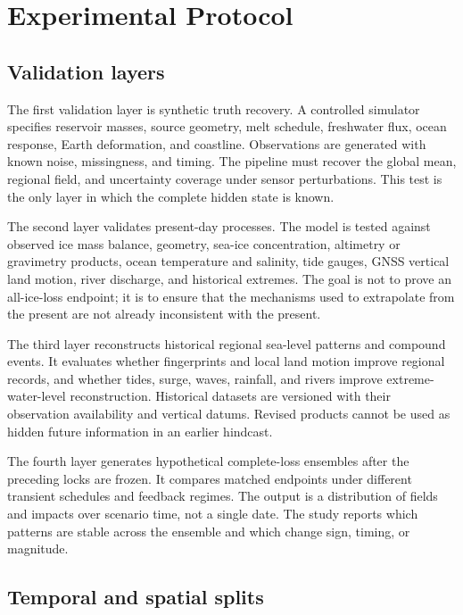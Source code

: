 \documentclass[conference]{IEEEtran}
\begin{document}
\section{Experimental Protocol}

\subsection{Validation layers}

The first validation layer is synthetic truth recovery. A controlled simulator specifies reservoir masses, source geometry, melt schedule, freshwater flux, ocean response, Earth deformation, and coastline. Observations are generated with known noise, missingness, and timing. The pipeline must recover the global mean, regional field, and uncertainty coverage under sensor perturbations. This test is the only layer in which the complete hidden state is known.

The second layer validates present-day processes. The model is tested against observed ice mass balance, geometry, sea-ice concentration, altimetry or gravimetry products, ocean temperature and salinity, tide gauges, GNSS vertical land motion, river discharge, and historical extremes. The goal is not to prove an all-ice-loss endpoint; it is to ensure that the mechanisms used to extrapolate from the present are not already inconsistent with the present.

The third layer reconstructs historical regional sea-level patterns and compound events. It evaluates whether fingerprints and local land motion improve regional records, and whether tides, surge, waves, rainfall, and rivers improve extreme-water-level reconstruction. Historical datasets are versioned with their observation availability and vertical datums. Revised products cannot be used as hidden future information in an earlier hindcast.

The fourth layer generates hypothetical complete-loss ensembles after the preceding locks are frozen. It compares matched endpoints under different transient schedules and feedback regimes. The output is a distribution of fields and impacts over scenario time, not a single date. The study reports which patterns are stable across the ensemble and which change sign, timing, or magnitude.

\subsection{Temporal and spatial splits}
\end{document}
